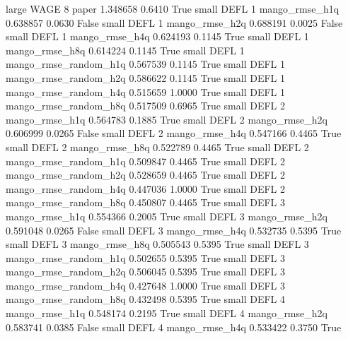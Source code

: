      large     WAGE                 8                 paper      1.348658      0.6410    True
     small     DEFL                 1        mango_rmse_h1q      0.638857      0.0630   False
     small     DEFL                 1        mango_rmse_h2q      0.688191      0.0025   False
     small     DEFL                 1        mango_rmse_h4q      0.624193      0.1145    True
     small     DEFL                 1        mango_rmse_h8q      0.614224      0.1145    True
     small     DEFL                 1 mango_rmse_random_h1q      0.567539      0.1145    True
     small     DEFL                 1 mango_rmse_random_h2q      0.586622      0.1145    True
     small     DEFL                 1 mango_rmse_random_h4q      0.515659      1.0000    True
     small     DEFL                 1 mango_rmse_random_h8q      0.517509      0.6965    True
     small     DEFL                 2        mango_rmse_h1q      0.564783      0.1885    True
     small     DEFL                 2        mango_rmse_h2q      0.606999      0.0265   False
     small     DEFL                 2        mango_rmse_h4q      0.547166      0.4465    True
     small     DEFL                 2        mango_rmse_h8q      0.522789      0.4465    True
     small     DEFL                 2 mango_rmse_random_h1q      0.509847      0.4465    True
     small     DEFL                 2 mango_rmse_random_h2q      0.528659      0.4465    True
     small     DEFL                 2 mango_rmse_random_h4q      0.447036      1.0000    True
     small     DEFL                 2 mango_rmse_random_h8q      0.450807      0.4465    True
     small     DEFL                 3        mango_rmse_h1q      0.554366      0.2005    True
     small     DEFL                 3        mango_rmse_h2q      0.591048      0.0265   False
     small     DEFL                 3        mango_rmse_h4q      0.532735      0.5395    True
     small     DEFL                 3        mango_rmse_h8q      0.505543      0.5395    True
     small     DEFL                 3 mango_rmse_random_h1q      0.502655      0.5395    True
     small     DEFL                 3 mango_rmse_random_h2q      0.506045      0.5395    True
     small     DEFL                 3 mango_rmse_random_h4q      0.427648      1.0000    True
     small     DEFL                 3 mango_rmse_random_h8q      0.432498      0.5395    True
     small     DEFL                 4        mango_rmse_h1q      0.548174      0.2195    True
     small     DEFL                 4        mango_rmse_h2q      0.583741      0.0385   False
     small     DEFL                 4        mango_rmse_h4q      0.533422      0.3750    True

